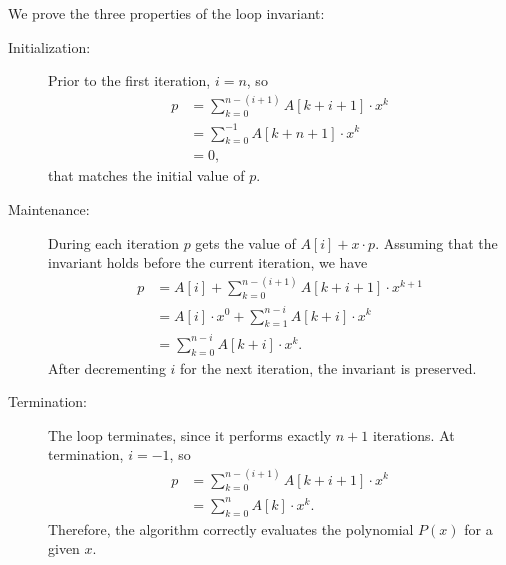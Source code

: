We prove the three properties of the loop invariant:
\begin{description}
    \item[Initialization:] Prior to the first iteration, $i=n$, so
    \begin{align*}
        p &= \sum_{k=0}^{n-(i+1)}A[k+i+1]\cdot x^k \\
        &= \sum_{k=0}^{-1}A[k+n+1]\cdot x^k \\
        &= 0,
    \end{align*}
    that matches the initial value of $p$.
    \item[Maintenance:] During each iteration $p$ gets the value of $A[i]+x\cdot p$.
    Assuming that the invariant holds before the current iteration, we have
    \begin{align*}
        p &= A[i]+\sum_{k=0}^{n-(i+1)}A[k+i+1]\cdot x^{k+1} \\
        &= A[i]\cdot x^0+\sum_{k=1}^{n-i}A[k+i]\cdot x^k \\
        &= \sum_{k=0}^{n-i}A[k+i]\cdot x^k.
    \end{align*}
    After decrementing $i$ for the next iteration, the invariant is preserved.
    \item[Termination:] The loop terminates, since it performs exactly $n+1$ iterations.
    At termination, $i=-1$, so
    \begin{align*}
        p &= \sum_{k=0}^{n-(i+1)}A[k+i+1]\cdot x^k \\
        &= \sum_{k=0}^nA[k]\cdot x^k.
    \end{align*}
    Therefore, the algorithm correctly evaluates the polynomial $P(x)$ for a given $x$.
\end{description}
